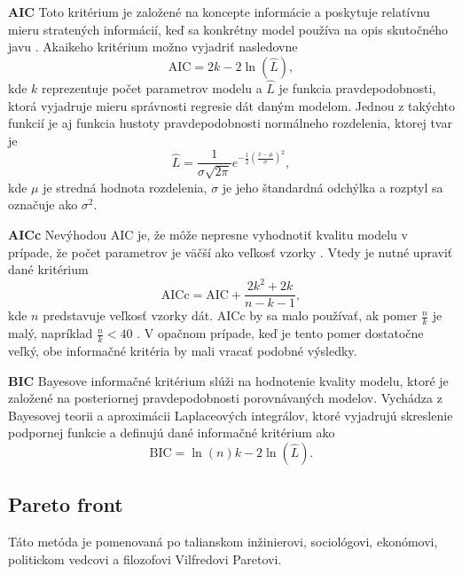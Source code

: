 \textbf{AIC}
\newline
Toto kritérium je založené na koncepte informácie a poskytuje relatívnu mieru stratených informácií, keď sa konkrétny model používa na opis skutočného javu \cite{emiliano:stand_crit:2014}. Akaikeho kritérium možno vyjadriť nasledovne
\begin{equation}
	\text{AIC} = 2k - 2\ln\left( \hat{L} \right),
\end{equation}
kde $ k $ reprezentuje počet parametrov modelu a $ \hat{L} $ je funkcia pravdepodobnosti, ktorá vyjadruje mieru správnosti regresie dát daným modelom. Jednou z takýchto funkcií je aj funkcia hustoty pravdepodobnosti normálneho rozdelenia, ktorej tvar je 
\begin{equation}
	\hat{L} = \frac{1}{\sigma \sqrt{2\pi}}e^{-\frac{1}{2}\left( \frac{x - \mu}{\sigma} \right)^2},
\end{equation}
kde $ \mu $ je stredná hodnota rozdelenia, $ \sigma $ je jeho štandardná odchýlka a rozptyl sa označuje ako $ \sigma^2 $.

\textbf{AICc}
\newline
Nevýhodou AIC je, že môže nepresne vyhodnotiť kvalitu modelu v prípade, že počet parametrov je väčší ako veľkosť vzorky \cite{emiliano:stand_crit:2014}. Vtedy je nutné upraviť dané kritérium
\begin{equation}
	\text{AICc} = \text{AIC} + \frac{2k^2 + 2k}{n - k - 1}, 
\end{equation}
kde $ n $ predstavuje veľkosť vzorky dát. AICc by sa malo používať, ak pomer $ \frac{n}{k} $ je malý, napríklad $ \frac{n}{k} < 40$ \cite{kenneth:understanding_stand_crit:2004}. V opačnom prípade, keď je tento pomer dostatočne veľký, obe informačné kritéria by mali vracať podobné výsledky.

\textbf{BIC}
\newline
Bayesove informačné kritérium slúži na hodnotenie kvality modelu, ktoré je založené na posteriornej pravdepodobnosti porovnávaných modelov. Vychádza z Bayesovej teorii a aproximácii Laplaceových integrálov, ktoré vyjadrujú skreslenie podpornej funkcie \cite{emiliano:stand_crit:2014} a definujú dané informačné kritérium ako
\begin{equation}
	\text{BIC} = \ln\left( n \right)k - 2\ln\left( \hat{L} \right).
\end{equation}

\subsection{Pareto front}
Táto metóda je pomenovaná po talianskom inžinierovi, sociológovi, ekonómovi, politickom vedcovi a filozofovi Vilfredovi Paretovi. 
